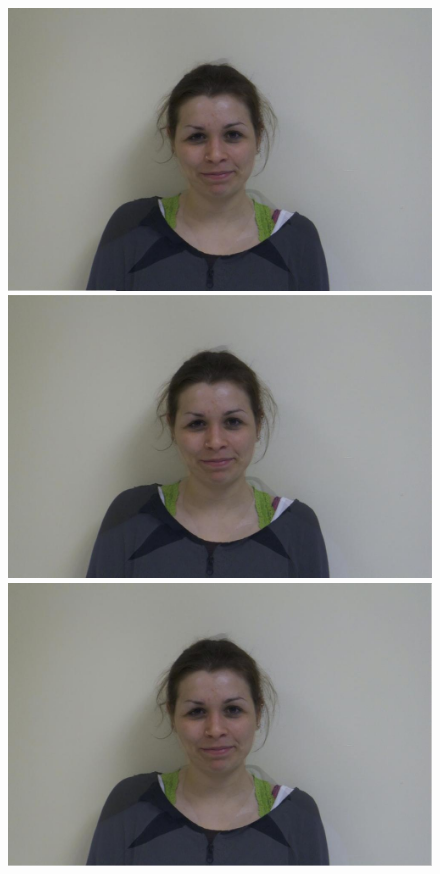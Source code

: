 \documentclass[11pt]{article}
\begin{document}
\begin{figure}[H]
\begin{center}
\includegraphics[scale=0.06]{figs/frames/morph_steinkirch_tangatur_10.jpg} 
\includegraphics[scale=0.06]{figs/frames/morph_steinkirch_tangatur_11.jpg} 
\includegraphics[scale=0.06]{figs/frames/morph_steinkirch_tangatur_12.jpg} 

\end{center}
\end{figure}
\end{document}

